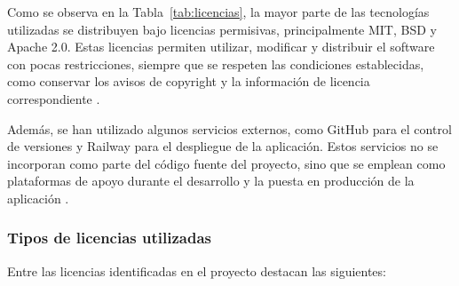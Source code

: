 Como se observa en la Tabla~\ref{tab:licencias}, la mayor parte de las tecnologías utilizadas se distribuyen bajo licencias permisivas, principalmente MIT, BSD y Apache 2.0. Estas licencias permiten utilizar, modificar y distribuir el software con pocas restricciones, siempre que se respeten las condiciones establecidas, como conservar los avisos de copyright y la información de licencia correspondiente \cite{mitLicense,apacheLicense,djangoLicense}.

Además, se han utilizado algunos servicios externos, como GitHub para el control de versiones y Railway para el despliegue de la aplicación. Estos servicios no se incorporan como parte del código fuente del proyecto, sino que se emplean como plataformas de apoyo durante el desarrollo y la puesta en producción de la aplicación \cite{githubPricing,railwayPricing}.

\subsubsection{Tipos de licencias utilizadas}

Entre las licencias identificadas en el proyecto destacan las siguientes:

